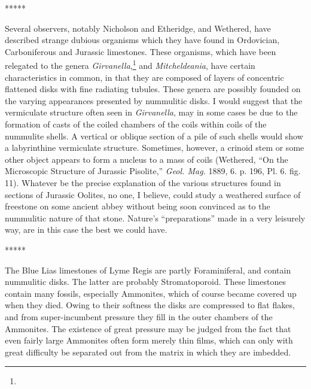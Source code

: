 \documentclass[a4paper, 12pt, oneside]{article}
\begin{document}
\centerline{*\hspace{15mm}*\hspace{15mm}*\hspace{15mm}*\hspace{15mm}*}
\bigskip

Several observers, notably Nicholson and Etheridge, and Wethered, have described strange dubious organisms which they have found in Ordovician, Carboniferous and Jurassic limestones. These organisms, which have been relegated to the genera \emph{Girvanella},\footnote{} and \emph{Mitcheldeania}, have certain characteristics in common, in that they are composed of layers of concentric flattened disks with fine radiating tubules. These genera are possibly founded on the varying appearances presented by nummulitic disks. I would suggest that the vermiculate structure often seen in \emph{Girvanella}, may in some cases be due to the formation of casts of the coiled chambers of the coils within coils of the nummulite shells. A vertical or oblique section of a pile of such shells would show a labyrinthine vermiculate structure. Sometimes, however, a crinoid stem or some other object appears to form a nucleus to a mass of coils (Wethered, ``On the Microscopic Structure of Jurassic Pisolite,'' \emph{Geol. Mag.} 1889, 6. p. 196, Pl. 6. fig. 11). Whatever be the precise explanation of the various structures found in sections of Jurassic Oolites, no one, I believe, could study a weathered surface of freestone on some ancient abbey without being soon convinced as to the nummulitic nature of that stone. Nature's ``preparations'' made in a very leisurely way, are in this case the best we could have.

\centerline{*\hspace{15mm}*\hspace{15mm}*\hspace{15mm}*\hspace{15mm}*}
\bigskip

The Blue Lias limestones of Lyme Regis are partly Foraminiferal, and contain nummulitic disks. The latter are probably Stromatoporoid. These limestones contain many fossils, especially Ammonites, which of course became covered up when they died. Owing to their softness the disks are compressed to flat flakes, and from super-incumbent pressure they fill in the outer chambers of the Ammonites. The existence of great pressure may be judged from the fact that even fairly large Ammonites often form merely thin films, which can only with great difficulty be separated out from the matrix in which they are imbedded.
\end{document}
